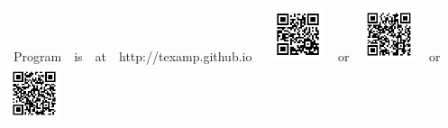 \documentclass[a3,portrait]{a0poster}
\begin{document}
\hskip 1cm
\mbox{
Program \ is \ at \ http://texamp.github.io
   \ \ \includegraphics[height=16mm,trim=0 11mm 0 -11mm]{texamp-2024-qr.png}
\ or \ \includegraphics[height=16mm,trim=0 11mm 0 -11mm]{texamp-2024-qr-mirror1.png}
\ or \ \includegraphics[height=16mm,trim=0 11mm 0 -11mm]{texamp-2024-qr-mirror2.png}
}
\end{document}
